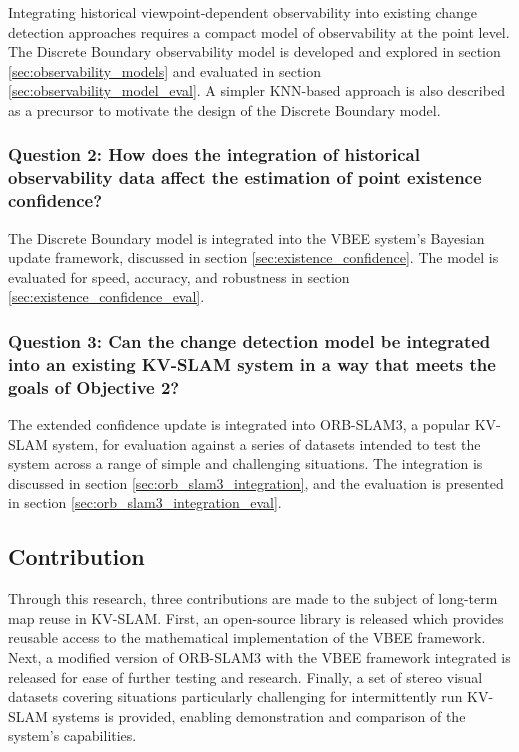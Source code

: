 Integrating historical viewpoint-dependent observability into existing change detection approaches requires a compact model of observability at the point level. The Discrete Boundary observability model is developed and explored in section \ref{sec:observability_models} and evaluated in section \ref{sec:observability_model_eval}. A simpler KNN-based approach is also described as a precursor to motivate the design of the Discrete Boundary model.

\subsubsection*{Question 2: How does the integration of historical observability data affect the estimation of point existence confidence?}

The Discrete Boundary model is integrated into the VBEE system's Bayesian update framework, discussed in section \ref{sec:existence_confidence}. The model is evaluated for speed, accuracy, and robustness in section \ref{sec:existence_confidence_eval}.

\subsubsection*{Question 3: Can the change detection model be integrated into an existing KV-SLAM system in a way that meets the goals of Objective 2?}

The extended confidence update is integrated into ORB-SLAM3, a popular KV-SLAM system, for evaluation against a series of datasets intended to test the system across a range of simple and challenging situations. The integration is discussed in section \ref{sec:orb_slam3_integration}, and the evaluation is presented in section \ref{sec:orb_slam3_integration_eval}.

\subsection{Contribution}

Through this research, three contributions are made to the subject of long-term map reuse in KV-SLAM. First, an open-source library is released which provides reusable access to the mathematical implementation of the VBEE framework. Next, a modified version of ORB-SLAM3 with the VBEE framework integrated is released for ease of further testing and research. Finally, a set of stereo visual datasets covering situations particularly challenging for intermittently run KV-SLAM systems is provided, enabling demonstration and comparison of the system's capabilities.

